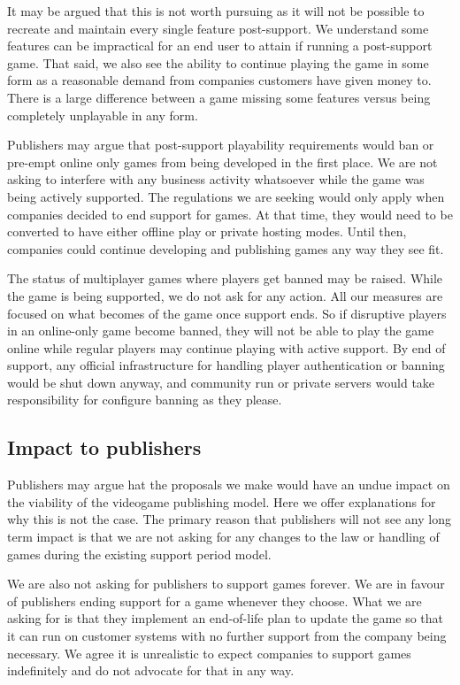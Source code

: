 It may be argued that this is not worth pursuing as it will not be possible to recreate and maintain every single feature post-support.
We understand some features can be impractical for an end user to attain if running a post-support game.%
That said, we also see the ability to continue playing the game in some form as a reasonable demand from companies customers have given money to.
There is a large difference between a game missing some features versus being completely unplayable in any form.

Publishers may argue that post-support playability requirements would ban or pre-empt online only games from being developed in the first place.
We are not asking to interfere with any business activity whatsoever while the game was being actively supported.
The regulations we are seeking would only apply when companies decided to end support for games.
At that time, they would need to be converted to have either offline play or private hosting modes.
Until then, companies could continue developing and publishing games any way they see fit.

The status of multiplayer games where players get banned may be raised.
While the game is being supported, we do not ask for any action.
All our measures are focused on what becomes of the game once support ends.
So if disruptive players in an online-only game become banned,
they will not be able to play the game online while regular players may continue playing with active support.
By end of support, any official infrastructure for handling player authentication or banning would be shut down anyway,
and community run or private servers would take responsibility for configure banning as they please.

\subsection{Impact to publishers}
Publishers may argue hat the proposals we make would have an undue impact on the viability of the videogame publishing model.
Here we offer explanations for why this is not the case.
The primary reason that publishers will not see any long term impact is that we are not asking for any changes to the law or handling of games during the existing support period model.

We are also not asking for publishers to support games forever.
We are in favour of publishers ending support for a game whenever they choose.
What we are asking for is that they implement an end-of-life plan to \gls{update} the game
so that it can run on customer systems with no further support from the company being necessary.
We agree it is unrealistic to expect companies to support games indefinitely and do not advocate for that in any way.

